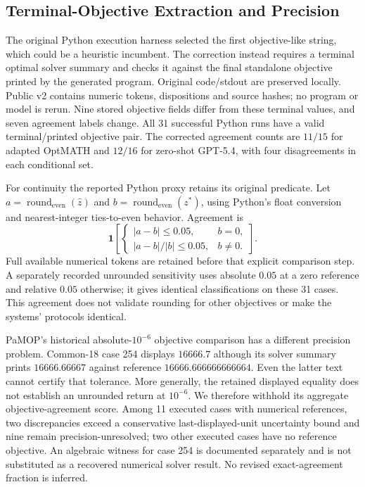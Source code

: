 \subsection{Terminal-Objective Extraction and Precision}
The original Python execution harness selected the first objective-like string, which could be a heuristic incumbent. The correction instead requires a terminal optimal solver summary and checks it against the final standalone objective printed by the generated program. Original code/stdout are preserved locally. Public v2 contains numeric tokens, dispositions and source hashes; no program or model is rerun. Nine stored objective fields differ from these terminal values, and seven agreement labels change. All 31 successful Python runs have a valid terminal/printed objective pair. The corrected agreement counts are $11/15$ for adapted OptMATH and $12/16$ for zero-shot GPT-5.4, with four disagreements in each conditional set.

For continuity the reported Python proxy retains its original predicate. Let $a=\operatorname{round}_{\mathrm{even}}(\hat z)$ and $b=\operatorname{round}_{\mathrm{even}}(z^*)$, using Python's float conversion and nearest-integer ties-to-even behavior. Agreement is
\begin{equation}
 \mathbf{1}\!\left[\begin{cases}|a-b|\leq0.05,&b=0,\\ |a-b|/|b|\leq0.05,&b\ne0.\end{cases}\right].
 \label{eq:common18-objective-proxy}
\end{equation}
Full available numerical tokens are retained before that explicit comparison step. A separately recorded unrounded sensitivity uses absolute $0.05$ at a zero reference and relative $0.05$ otherwise; it gives identical classifications on these 31 cases. This agreement does not validate rounding for other objectives or make the systems' protocols identical.

PaMOP's historical absolute-$10^{-6}$ objective comparison has a different precision problem. Common-18 case 254 displays $16666.7$ although its solver summary prints $16666.66667$ against reference $16666.666666666664$. Even the latter text cannot certify that tolerance. More generally, the retained displayed equality does not establish an unrounded return at $10^{-6}$. We therefore withhold its aggregate objective-agreement score. Among 11 executed cases with numerical references, two discrepancies exceed a conservative last-displayed-unit uncertainty bound and nine remain precision-unresolved; two other executed cases have no reference objective. An algebraic witness for case 254 is documented separately and is not substituted as a recovered numerical solver result. No revised exact-agreement fraction is inferred.

